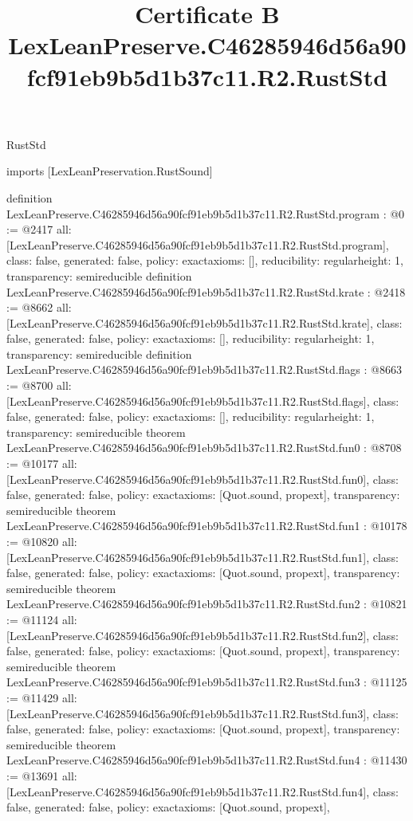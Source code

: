 \begin{lexlean}{RustStd}
\title{Certificate B LexLeanPreserve.C46285946d56a90fcf91eb9b5d1b37c11.R2.RustStd}
\begin{coremodule}
imports [LexLeanPreservation.RustSound]

definition LexLeanPreserve.C46285946d56a90fcf91eb9b5d1b37c11.R2.RustStd.program : @0 := @2417 {
  all: [LexLeanPreserve.C46285946d56a90fcf91eb9b5d1b37c11.R2.RustStd.program],
  class: false,
  generated: false,
  policy: exact{axioms: []},
  reducibility: regular{height: 1},
  transparency: semireducible
}
definition LexLeanPreserve.C46285946d56a90fcf91eb9b5d1b37c11.R2.RustStd.krate : @2418 := @8662 {
  all: [LexLeanPreserve.C46285946d56a90fcf91eb9b5d1b37c11.R2.RustStd.krate],
  class: false,
  generated: false,
  policy: exact{axioms: []},
  reducibility: regular{height: 1},
  transparency: semireducible
}
definition LexLeanPreserve.C46285946d56a90fcf91eb9b5d1b37c11.R2.RustStd.flags : @8663 := @8700 {
  all: [LexLeanPreserve.C46285946d56a90fcf91eb9b5d1b37c11.R2.RustStd.flags],
  class: false,
  generated: false,
  policy: exact{axioms: []},
  reducibility: regular{height: 1},
  transparency: semireducible
}
theorem LexLeanPreserve.C46285946d56a90fcf91eb9b5d1b37c11.R2.RustStd.fun0 : @8708 := @10177 {
  all: [LexLeanPreserve.C46285946d56a90fcf91eb9b5d1b37c11.R2.RustStd.fun0],
  class: false,
  generated: false,
  policy: exact{axioms: [Quot.sound, propext]},
  transparency: semireducible
}
theorem LexLeanPreserve.C46285946d56a90fcf91eb9b5d1b37c11.R2.RustStd.fun1 : @10178 := @10820 {
  all: [LexLeanPreserve.C46285946d56a90fcf91eb9b5d1b37c11.R2.RustStd.fun1],
  class: false,
  generated: false,
  policy: exact{axioms: [Quot.sound, propext]},
  transparency: semireducible
}
theorem LexLeanPreserve.C46285946d56a90fcf91eb9b5d1b37c11.R2.RustStd.fun2 : @10821 := @11124 {
  all: [LexLeanPreserve.C46285946d56a90fcf91eb9b5d1b37c11.R2.RustStd.fun2],
  class: false,
  generated: false,
  policy: exact{axioms: [Quot.sound, propext]},
  transparency: semireducible
}
theorem LexLeanPreserve.C46285946d56a90fcf91eb9b5d1b37c11.R2.RustStd.fun3 : @11125 := @11429 {
  all: [LexLeanPreserve.C46285946d56a90fcf91eb9b5d1b37c11.R2.RustStd.fun3],
  class: false,
  generated: false,
  policy: exact{axioms: [Quot.sound, propext]},
  transparency: semireducible
}
theorem LexLeanPreserve.C46285946d56a90fcf91eb9b5d1b37c11.R2.RustStd.fun4 : @11430 := @13691 {
  all: [LexLeanPreserve.C46285946d56a90fcf91eb9b5d1b37c11.R2.RustStd.fun4],
  class: false,
  generated: false,
  policy: exact{axioms: [Quot.sound, propext]},
}
\end{coremodule}
\end{lexlean}
